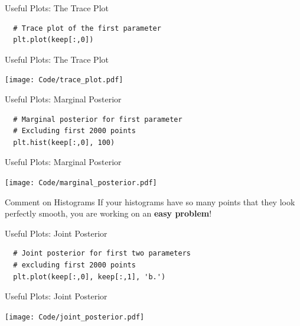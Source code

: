 \begin{frame}[t, fragile]{Useful Plots: The Trace Plot}
\begin{verbatim}
  # Trace plot of the first parameter
  plt.plot(keep[:,0])
\end{verbatim}
\end{frame}

\begin{frame}[t]{Useful Plots: The Trace Plot}
\begin{center}
\texttt{[image: Code/trace\_plot.pdf]}
\end{center}
\end{frame}


\begin{frame}[t, fragile]{Useful Plots: Marginal Posterior}
\begin{verbatim}
  # Marginal posterior for first parameter
  # Excluding first 2000 points
  plt.hist(keep[:,0], 100)
\end{verbatim}
\end{frame}

\begin{frame}[t]{Useful Plots: Marginal Posterior}
\begin{center}
\texttt{[image: Code/marginal\_posterior.pdf]}
\end{center}
\end{frame}

\begin{frame}[t]{Comment on Histograms}
If your histograms have so many points that they look perfectly smooth, you
are working on an {\bf easy problem}!
\end{frame}


\begin{frame}[t, fragile]{Useful Plots: Joint Posterior}
\begin{verbatim}
  # Joint posterior for first two parameters
  # excluding first 2000 points
  plt.plot(keep[:,0], keep[:,1], 'b.')
\end{verbatim}
\end{frame}

\begin{frame}[t]{Useful Plots: Joint Posterior}
\begin{center}
\texttt{[image: Code/joint\_posterior.pdf]}
\end{center}
\end{frame}


